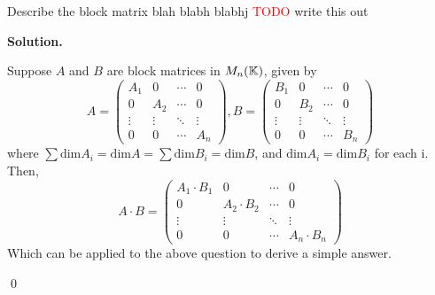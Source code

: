 \documentclass[12pt]{book}
\theoremstyle{definition}
\newenvironment{solution}
{%
  \par\noindent\textbf{Solution.}\quad
}
{%
  \qed\par
}
\begin{document}
\begin{taggedexercise}[\textcolor{green}{Complete}]
  Describe the block matrix blah blabh blabhj \textcolor{red}{TODO} write this out
\end{taggedexercise}
\begin{solution}
  Suppose $A$ and $B$ are block matrices in $M_n(\mathbb{K})$, given by
  \[
A = \begin{pmatrix}
A_1 & 0   & \cdots & 0 \\
0   & A_2 & \cdots & 0 \\
\vdots & \vdots & \ddots & \vdots \\
0   & 0   & \cdots & A_n
\end{pmatrix},
B = \begin{pmatrix}
  B_1 & 0   & \cdots & 0 \\
  0   & B_2 & \cdots & 0 \\
  \vdots & \vdots & \ddots & \vdots \\
  0   & 0   & \cdots & B_n
  \end{pmatrix}
\]
where $\sum \text{dim}A_i = \text{dim}A = \sum \text{dim}B_i = \text{dim}B$, and $\text{dim} A_i = \text{dim}B_i$ for each i.
Then,
\[
  A \cdot B = \begin{pmatrix}
    A_1\cdot B_1 & 0   & \cdots & 0 \\
    0   & A_2 \cdot B_2 & \cdots & 0 \\
    \vdots & \vdots & \ddots & \vdots \\
    0   & 0   & \cdots & A_n \cdot B_n
    \end{pmatrix}
\]
Which can be applied to the above question to derive a simple answer.

\end{solution}
\end{document}
